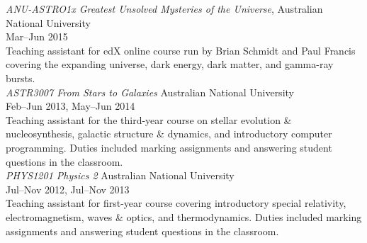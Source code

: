 \documentclass[11pt]{res} %
\begin{document}
\begin{resume}
  {\it ANU-ASTRO1x Greatest Unsolved Mysteries of the Universe}, \hfill Australian National University\\
  \null\hfill Mar--Jun 2015\\
  Teaching assistant for edX online course run by Brian Schmidt and Paul Francis covering the expanding universe, dark energy, dark matter, and gamma-ray bursts.\\

  {\it ASTR3007 From Stars to Galaxies} \hfill Australian National University\\
  \null\hfill Feb--Jun 2013, May--Jun 2014\\
  Teaching assistant for the third-year course on stellar evolution \& nucleosynthesis, galactic structure \& dynamics, and introductory computer programming. Duties included marking assignments and answering student questions in the classroom.\\

  {\it PHYS1201 Physics 2} \hfill Australian National University\\
  \null\hfill Jul--Nov 2012, Jul--Nov 2013\\
  Teaching assistant for first-year course covering introductory special relativity, electromagnetism, waves \& optics, and thermodynamics. Duties included marking assignments and answering student questions in the classroom.

\begin{comment}
\section{Referees}
  \textbf{Dr. Amanda Karakas}\\
  Future Fellow, Research School of Astronomy \& Astrophysics\\
  Australian National University\\
  amanda.karakas@anu.edu.au

  \textbf{Prof. Gary Da Costa}\\
  Professor, Research School of Astronomy \& Astrophysics\\
  Australian National University\\
  gary.dacosta@anu.edu.au

  \textbf{Dr. Chiaki Kobayashi}\\
  Senior Lecturer, Centre for Astrophysics Research\\
  University of Hertfordshire, UK\\
  c.kobayashi@herts.ac.uk
\end{comment}
\end{resume}
\end{document}
